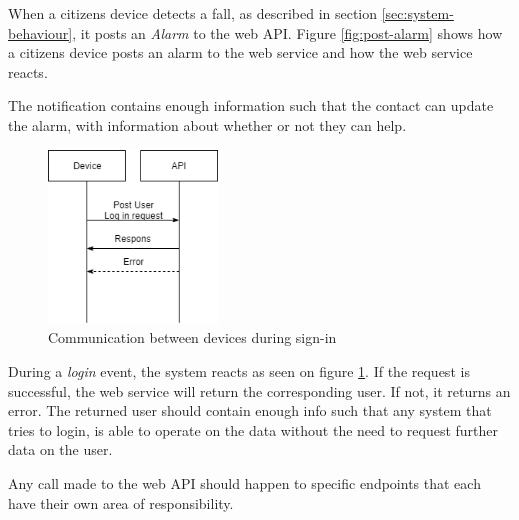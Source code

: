 When a citizens device detects a fall, as described in section \ref{sec:system-behaviour}, it posts an \textit{Alarm} to the web API.
Figure \ref{fig:post-alarm} shows how a citizens device posts an alarm to the web service and how the web service reacts.

The notification contains enough information such that the contact can update the alarm, with information about whether or not they can help.

\begin{figure}[H]
    \centering
    \includegraphics[width=0.4\textwidth]{Figures/Device-Api.png}
    \caption{Communication between devices during sign-in}
    \label{fig:post-sign-in}
\end{figure}

During a \textit{login} event, the system reacts as seen on figure \ref{fig:post-sign-in}. If the request is successful, the web service will return the corresponding user. If not, it returns an error. The returned user should contain enough info such that any system that tries to login, is able to operate on the data without the need to request further data on the user.

Any call made to the web API should happen to specific endpoints that each have their own area of responsibility.

